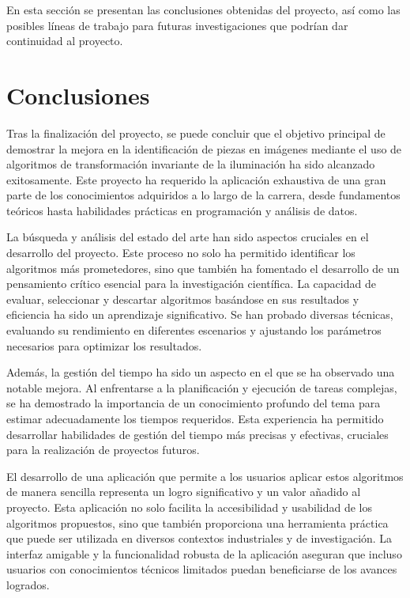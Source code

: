 
En esta sección se presentan las conclusiones obtenidas del proyecto, así como las posibles líneas de trabajo para futuras investigaciones que podrían dar continuidad al proyecto.

\section{Conclusiones}\label{conclusiones}

Tras la finalización del proyecto, se puede concluir que el objetivo principal de demostrar la mejora en la identificación de piezas en imágenes mediante el uso de algoritmos de transformación invariante de la iluminación ha sido alcanzado exitosamente. Este proyecto ha requerido la aplicación exhaustiva de una gran parte de los conocimientos adquiridos a lo largo de la carrera, desde fundamentos teóricos hasta habilidades prácticas en programación y análisis de datos.

La búsqueda y análisis del estado del arte han sido aspectos cruciales en el desarrollo del proyecto. Este proceso no solo ha permitido identificar los algoritmos más prometedores, sino que también ha fomentado el desarrollo de un pensamiento crítico esencial para la investigación científica. La capacidad de evaluar, seleccionar y descartar algoritmos basándose en sus resultados y eficiencia ha sido un aprendizaje significativo. Se han probado diversas técnicas, evaluando su rendimiento en diferentes escenarios y ajustando los parámetros necesarios para optimizar los resultados.

Además, la gestión del tiempo ha sido un aspecto en el que se ha observado una notable mejora. Al enfrentarse a la planificación y ejecución de tareas complejas, se ha demostrado la importancia de un conocimiento profundo del tema para estimar adecuadamente los tiempos requeridos. Esta experiencia ha permitido desarrollar habilidades de gestión del tiempo más precisas y efectivas, cruciales para la realización de proyectos futuros.

El desarrollo de una aplicación que permite a los usuarios aplicar estos algoritmos de manera sencilla representa un logro significativo y un valor añadido al proyecto. Esta aplicación no solo facilita la accesibilidad y usabilidad de los algoritmos propuestos, sino que también proporciona una herramienta práctica que puede ser utilizada en diversos contextos industriales y de investigación. La interfaz amigable y la funcionalidad robusta de la aplicación aseguran que incluso usuarios con conocimientos técnicos limitados puedan beneficiarse de los avances logrados.

